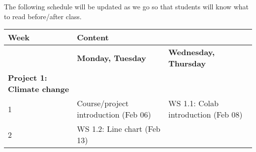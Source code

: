 \documentclass[
]{article}
\begin{document}
The following schedule will be updated as we go so that students will know what to read
before/after class.

\begin{longtable}[]{@{}lll@{}}
\toprule
\begin{minipage}[b]{0.18\columnwidth}\raggedright
\textbf{Week}\strut
\end{minipage} & \begin{minipage}[b]{0.38\columnwidth}\raggedright
\textbf{Content}\strut
\end{minipage} & \begin{minipage}[b]{0.36\columnwidth}\raggedright
\strut
\end{minipage}\tabularnewline
\midrule
\endhead
\begin{minipage}[t]{0.18\columnwidth}\raggedright
\strut
\end{minipage} & \begin{minipage}[t]{0.38\columnwidth}\raggedright
\textbf{Monday, Tuesday}\strut
\end{minipage} & \begin{minipage}[t]{0.36\columnwidth}\raggedright
\textbf{Wednesday, Thursday}\strut
\end{minipage}\tabularnewline
\begin{minipage}[t]{0.18\columnwidth}\raggedright
\textbf{Project 1: Climate change}\strut
\end{minipage} & \begin{minipage}[t]{0.38\columnwidth}\raggedright
\strut
\end{minipage} & \begin{minipage}[t]{0.36\columnwidth}\raggedright
\strut
\end{minipage}\tabularnewline
\begin{minipage}[t]{0.18\columnwidth}\raggedright
1\strut
\end{minipage} & \begin{minipage}[t]{0.38\columnwidth}\raggedright
Course/project introduction (Feb 06)\strut
\end{minipage} & \begin{minipage}[t]{0.36\columnwidth}\raggedright
WS 1.1: Colab introduction (Feb 08)\strut
\end{minipage}\tabularnewline
\begin{minipage}[t]{0.18\columnwidth}\raggedright
2\strut
\end{minipage} & \begin{minipage}[t]{0.38\columnwidth}\raggedright
WS 1.2: Line chart (Feb 13)\strut

\end{minipage}
\end{longtable}
\end{document}
